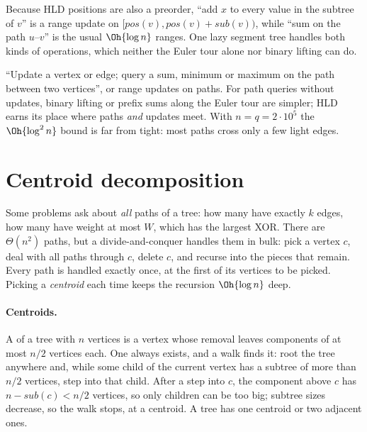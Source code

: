 \begin{trick}
Because HLD positions are also a preorder, ``add $x$ to every value in the subtree of $v$'' is a range update on
$[\mathit{pos}(v), \mathit{pos}(v) + \mathit{sub}(v))$, while ``sum on the path $u$--$v$'' is the usual $\Oh{\log n}$ ranges. One
lazy segment tree handles both kinds of operations, which neither the Euler tour alone nor binary lifting can do.
\end{trick}

\begin{recognize}
``Update a vertex or edge; query a sum, minimum or maximum on the path between two vertices'', or range updates on paths. For
path queries without updates, binary lifting or prefix sums along the Euler tour are simpler; HLD earns its place where paths
\emph{and} updates meet. With $n = q = 2 \cdot 10^5$ the $\Oh{\log^2 n}$ bound is far from tight: most paths cross only a few
light edges.
\end{recognize}

\section[Centroid decomposition]{Centroid decomposition \hfill \plat}\label{sec:centroid}

Some problems ask about \emph{all} paths of a tree: how many have exactly $k$ edges, how many have weight at most $W$, which has
the largest XOR. There are $\Theta(n^2)$ paths, but a divide-and-conquer handles them in bulk: pick a vertex $c$, deal with all
paths through $c$, delete $c$, and recurse into the pieces that remain. Every path is handled exactly once, at the first of its
vertices to be picked. Picking a \emph{centroid} each time keeps the recursion $\Oh{\log n}$ deep.

\paragraph{Centroids.} A  of a tree with $n$ vertices is a vertex whose removal leaves components of at most $n/2$
vertices each. One always exists, and a walk finds it: root the tree anywhere and, while some child of the current vertex has a
subtree of more than $n/2$ vertices, step into that child. After a step into $c$, the component above $c$ has $n -
\mathit{sub}(c) < n/2$ vertices, so only children can be too big; subtree sizes decrease, so the walk stops, at a centroid. A tree
has one centroid or two adjacent ones.

